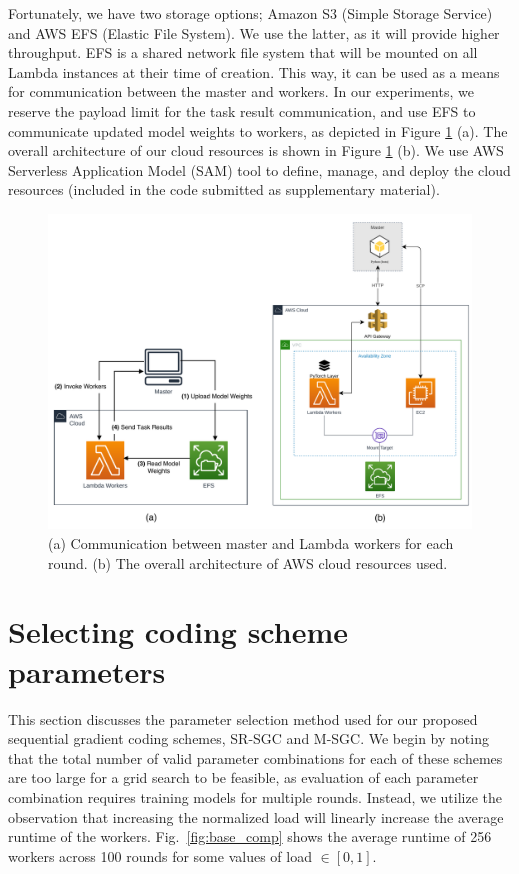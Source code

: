 Fortunately, we have two storage options; Amazon S3 (Simple Storage Service) and AWS EFS (Elastic File System). We use the latter, as it will provide higher throughput. EFS is a shared network file system that will be mounted on all Lambda instances at their time of creation. This way, it can be used as a means for communication between the master and workers. In our experiments, we reserve the payload limit for the task result communication, and use EFS to communicate updated model weights to workers, as depicted in Figure \ref{fig:aws} (a). The overall architecture of our cloud resources is shown in Figure \ref{fig:aws} (b). We use AWS Serverless Application Model (SAM) tool to define, manage, and deploy the cloud resources (included in the code submitted as supplementary material).  

\begin{figure}[h]
	\centering
	\includegraphics[width=\textwidth]{figures/ch2/aws.pdf}
	\caption{(a) Communication between master and Lambda workers for each round. (b) The overall architecture of AWS cloud resources used.}
	\label{fig:aws}
\end{figure}

\section{Selecting coding scheme parameters}\label{sec:param_selection}

This section discusses the parameter selection method used for our proposed sequential gradient coding schemes, SR-SGC and M-SGC. We begin by noting that the total number of valid parameter combinations for each of these schemes are too large for a grid search to be feasible, as evaluation of each parameter combination requires training models for multiple rounds. Instead, we utilize the observation that increasing the normalized load will linearly increase the average runtime of the workers. Fig.~\ref{fig:base_comp} shows the average runtime of 256 workers across 100 rounds for some values of load $\in [0, 1]$. 

